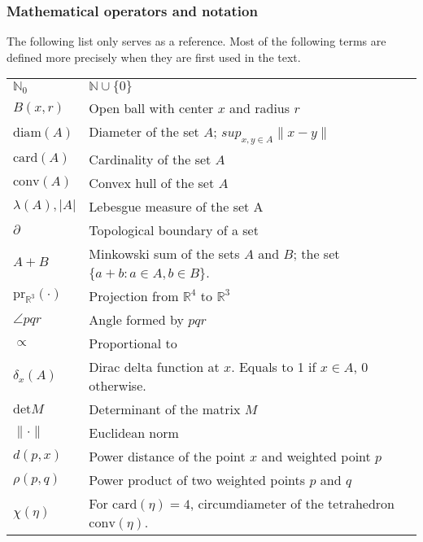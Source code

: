 \documentclass[12pt,a4paper]{report}
\newcommand{\Rt}{{\mathbb R^3}}
\theoremstyle{definition}
\theoremstyle{remark}
\theoremstyle{theorem}
\theoremstyle{remark}
\begin{document}



\tableofcontents



\subsubsection{Mathematical operators and notation}
The following list only serves as a reference. Most of the following terms are defined more precisely when they are first used in the text.

\hspace*{-8mm}
\begin{tabular}{ l l }
	$\mathbb N_0$ & $\mathbb N \cup \{0\}$ \\
	$B(x,r)$ & Open ball with center $x$ and radius $r$ \\
	$\mathrm{diam}(A)$ & Diameter of the set $A$; $sup_{x,y\in A}\|x-y\|$ \\
	$\mathrm{card}(A)$ & Cardinality of the set $A$ \\
	$\mathrm{conv}(A)$ & Convex hull of the set $A$ \\
	$\lambda(A), |A|$ & Lebesgue measure of the set A \\
	$\partial$ & Topological boundary of a set \\
	$A+B$ & Minkowski sum of the sets $A$ and $B$; the set $\{a+b: a\in A, b\in B\}$. \\
	$\mathrm{pr}_{\Rt}(\cdot)$ & Projection from $\mathbb R^4$ to $\Rt$ \\
	$\angle pqr$ & Angle formed by $pqr$ \\
	$\propto$ & Proportional to \\
	$\delta_x(A)$ & Dirac delta function at $x$. Equals to 1 if $x\in A$, 0 otherwise.\\ 
	$\mathrm{det} M$ & Determinant of the matrix $M$ \\
	$\| \cdot \|$ & Euclidean norm \\
	$d(p,x)$ & Power distance of the point $x$ and weighted point $p$ \\
	$\rho(p,q)$ & Power product of two weighted points $p$ and $q$ \\
	$\chi(\eta)$ & For $\mathrm{card}(\eta)=4$, circumdiameter of the tetrahedron $\mathrm{conv}(\eta)$.\\
\end{tabular}
\end{document}
